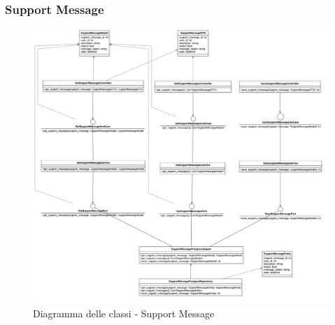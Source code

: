 \subsubsection{Support Message}
\begin{figure}[H]
    \centering
    \includegraphics[width=\linewidth, height=0.8\textheight, keepaspectratio]{./img/SupportMessage.png}
    \caption{Diagramma delle classi - Support Message}
    \label{fig:support_message}
\end{figure}



